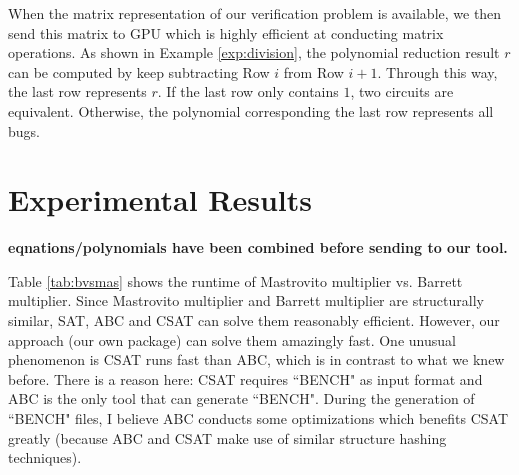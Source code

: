 When the matrix representation of our verification problem is available, we then send this matrix to GPU 
which is highly efficient at conducting matrix operations.
As shown in Example \ref{exp:division}, the polynomial reduction result $r$ can be computed by keep subtracting 
Row $i$ from Row $i+1$. Through this way, the last row represents $r$. If the last row only contains $1$,
two circuits are equivalent. Otherwise, the polynomial corresponding the last row represents all bugs.

\section{Experimental Results}

{\bf eqnations/polynomials have been combined before sending to our tool.}

Table \ref{tab:bvsmas} shows the runtime of Mastrovito multiplier vs. Barrett multiplier. 
Since Mastrovito multiplier and Barrett multiplier are structurally similar, SAT, ABC and CSAT can solve them reasonably efficient.
However, our approach (our own package) can solve them amazingly fast. 
One unusual phenomenon is CSAT runs fast than ABC, which is in contrast to what we knew before. 
There is a reason here: CSAT requires ``BENCH" as input format and ABC is the only tool that can generate ``BENCH". During the generation of ``BENCH" files, 
I believe ABC conducts some optimizations which benefits CSAT greatly (because ABC and CSAT make use of similar structure hashing techniques). 

